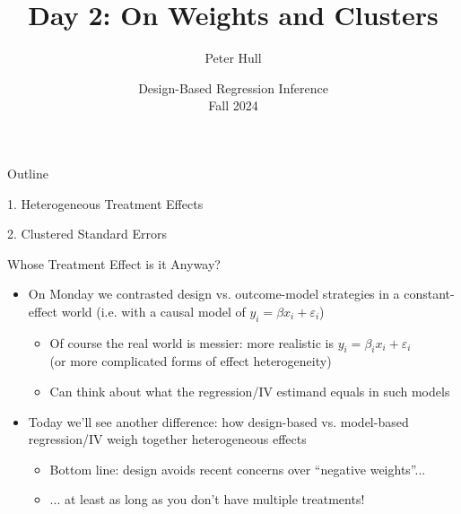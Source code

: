 \documentclass[11pt,english]{beamer}
\begin{document}
\begin{frame}[noframenumbering]{}
\vspace{0.5cm}
\title[]{Day 2: On Weights and Clusters}
\author{Peter Hull}
\date{Design-Based Regression Inference \\Fall 2024} 
\titlepage {\small{}\ }\thispagestyle{empty} \vspace{-30pt}

\end{frame}
 

\begin{frame}{Outline}

1. Heterogeneous Treatment Effects
\vspace{0.8cm}

2. Clustered Standard Errors

\end{frame}

\begin{frame}{Whose Treatment Effect is it Anyway?}
\begin{itemize}
\item On Monday we contrasted design vs. outcome-model strategies in a constant-effect world (i.e. with a causal model of $y_i=\beta x_i+\varepsilon_i$)\smallskip
\begin{itemize}
\item Of course the real world is messier: more realistic is $y_i=\beta_i x_i+\varepsilon_i$ \\ (or more complicated forms of effect heterogeneity) \smallskip\pause{}
\item Can think about what the regression/IV estimand equals in such models
\end{itemize}\bigskip\pause{}
\item Today we'll see another difference: how design-based vs. model-based regression/IV weigh together heterogeneous effects\smallskip
\begin{itemize}
\item Bottom line: design avoids recent concerns over ``negative weights''...\smallskip\pause{}
\item ... at least as long as you don't have multiple treatments! 
\end{itemize}
\end{itemize}
\end{frame}
\end{document}
